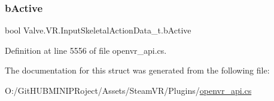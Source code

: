 \mbox{\label{struct_valve_1_1_v_r_1_1_input_skeletal_action_data__t_a22c1e1108ac7f6d4302638b5cb7996f3}} 
\subsubsection{\texorpdfstring{bActive}{bActive}}
{\footnotesize\ttfamily bool Valve.\+V\+R.\+Input\+Skeletal\+Action\+Data\+\_\+t.\+b\+Active}



Definition at line 5556 of file openvr\+\_\+api.\+cs.



The documentation for this struct was generated from the following file\+:\begin{DoxyCompactItemize}
\item 
O\+:/\+Git\+H\+U\+B\+M\+I\+N\+I\+P\+Roject/\+Assets/\+Steam\+V\+R/\+Plugins/\mbox{\hyperlink{openvr__api_8cs}{openvr\+\_\+api.\+cs}}\end{DoxyCompactItemize}
